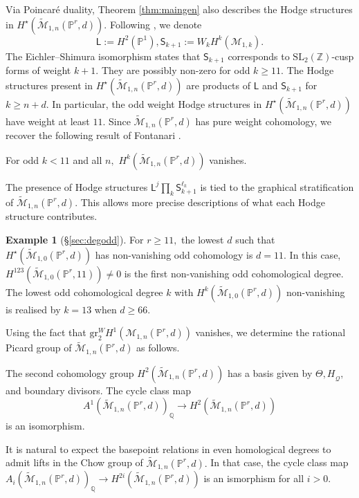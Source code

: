 \documentclass[12pt,reqno]{amsart}
\theoremstyle{definition}
\theoremstyle{definition}
\newenvironment{customcor}[1]
  {\renewcommand\theinnercustomcor{#1}\innercustomcor}
  {\endinnercustomcor}
\theoremstyle{definition}
\theoremstyle{definition}
\newtheorem{example}[theorem]{Example}
\newcommand{\PP}{\mathbb{P}}
\newcommand{\Mtil}{\widetilde{\mathcal{M}}}
\begin{document}
Via Poincaré duality, Theorem \ref{thm:maingen} also describes the Hodge structures in $H^\star(\Mtil_{1,n}(\mathbb{P}^r,d)).$ Following \cite{clp}, we denote $$\mathsf{L}:=H^2(\mathbb{P}^1),\mathsf{S}_{k+1}:=W_k H^k(\mathcal{M}_{1,k}).$$ The Eichler--Shimura isomorphism states that $\mathsf{S}_{k+1}$ corresponds to $\mathrm{SL}_2(\mathbb{Z})$-cusp forms of weight $k+1.$ They are possibly non-zero for odd $k\geq 11.$ The Hodge structures present in $H^\star(\Mtil_{1,n}(\mathbb{P}^r,d))$ are products of $\mathsf{L}$ and $\mathsf{S}_{k+1}$ for $k\geq n+d.$ In particular, the odd weight Hodge structures in $H^\star(\Mtil_{1,n}(\mathbb{P}^r,d))$ have weight at least $11.$ Since $\Mtil_{1,n}(\mathbb{P}^r,d)$ has pure weight cohomology, we recover the following result of Fontanari \cite{Fontanari}.

\begin{customcor}{E}[Corollary \ref{cor:oddvan}]
  For odd $k< 11$ and all $n,$ $H^k(\Mtil_{1,n}(\mathbb{P}^r,d))$ vanishes.
\end{customcor}

The presence of Hodge structures $\mathsf{L}^j \prod_{k}\mathsf{S}_{k+1}^{\ell_k}$ is tied to the graphical stratification of $\Mtil_{1,n}(\mathbb{P}^r,d)$. This allows more precise descriptions of what each Hodge structure contributes.

\begin{example}[§\ref{sec:degodd}]
  For $r\geq 11,$ the lowest $d$ such that $H^\star(\Mtil_{1,0}(\mathbb{P}^r,d))$ has non-vanishing odd cohomology is $d=11.$ In this case, $H^{123}(\Mtil_{1,0}(\mathbb{P}^r,11))\neq 0$ is the first non-vanishing odd cohomological degree. The lowest odd cohomological degree $k$ with  $H^k(\Mtil_{1,0}(\mathbb{P}^r,d))$ non-vanishing is realised by $k = 13$ when $d \geq 66.$
\end{example}

Using the fact that $\mathrm{gr}^W_2 H^1(\mathcal{M}_{1,n}(\PP^r,d))$ vanishes, we determine the rational Picard group of $\Mtil_{1,n}(\PP^r,d)$ as follows.

\begin{customcor}{F}[Proposition \ref{prop:Pic}]\label{cor:F}
 The second cohomology group $H^2(\Mtil_{1,n}(\mathbb{P}^r,d))$ has a basis given by $\Theta, H_{\hat{\mathcal{Q}}},$ and boundary divisors. The cycle class map $$A^1(\Mtil_{1,n}(\mathbb{P}^r,d))_{\mathbb{Q}}\to H^2(\Mtil_{1,n}(\mathbb{P}^r,d))$$ is an isomorphism.
\end{customcor}

It is natural to expect the basepoint relations in even homological degrees to admit lifts in the Chow group of $\Mtil_{1,n}(\PP^r,d).$ In that case, the cycle class map $A_{i}(\Mtil_{1,n}(\mathbb{P}^r,d))_{\mathbb{Q}}\to H^{2i}(\Mtil_{1,n}(\mathbb{P}^r,d))$ is an ismorphism for all $i>0.$
\end{document}
